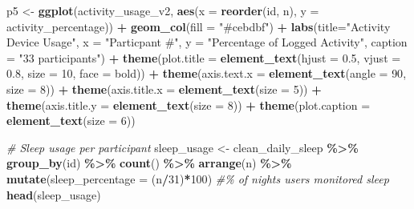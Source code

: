 \documentclass[
]{article}
\newenvironment{Shaded}{\begin{snugshade}}{\end{snugshade}}
\newcommand{\AttributeTok}[1]{\textcolor[rgb]{0.13,0.29,0.53}{#1}}
\newcommand{\CommentTok}[1]{\textcolor[rgb]{0.56,0.35,0.01}{\textit{#1}}}
\newcommand{\DecValTok}[1]{\textcolor[rgb]{0.00,0.00,0.81}{#1}}
\newcommand{\FloatTok}[1]{\textcolor[rgb]{0.00,0.00,0.81}{#1}}
\newcommand{\FunctionTok}[1]{\textcolor[rgb]{0.13,0.29,0.53}{\textbf{#1}}}
\newcommand{\NormalTok}[1]{#1}
\newcommand{\OtherTok}[1]{\textcolor[rgb]{0.56,0.35,0.01}{#1}}
\newcommand{\SpecialCharTok}[1]{\textcolor[rgb]{0.81,0.36,0.00}{\textbf{#1}}}
\newcommand{\StringTok}[1]{\textcolor[rgb]{0.31,0.60,0.02}{#1}}
\begin{document}
\begin{Shaded}
\begin{Highlighting}[]
\NormalTok{p5 }\OtherTok{\textless{}{-}} \FunctionTok{ggplot}\NormalTok{(activity\_usage\_v2, }\FunctionTok{aes}\NormalTok{(}\AttributeTok{x =} \FunctionTok{reorder}\NormalTok{(id, n), }\AttributeTok{y =}\NormalTok{ activity\_percentage)) }\SpecialCharTok{+}
  \FunctionTok{geom\_col}\NormalTok{(}\AttributeTok{fill =} \StringTok{"\#cebdbf"}\NormalTok{)  }\SpecialCharTok{+} 
  \FunctionTok{labs}\NormalTok{(}\AttributeTok{title=}\StringTok{"Activity Device Usage"}\NormalTok{, }\AttributeTok{x =} \StringTok{"Particpant \#"}\NormalTok{, }\AttributeTok{y =} \StringTok{"Percentage of Logged Activity"}\NormalTok{, }\AttributeTok{caption =} \StringTok{"33 participants"}\NormalTok{) }\SpecialCharTok{+}
  \FunctionTok{theme}\NormalTok{(}\AttributeTok{plot.title =} \FunctionTok{element\_text}\NormalTok{(}\AttributeTok{hjust =} \FloatTok{0.5}\NormalTok{, }\AttributeTok{vjust =} \FloatTok{0.8}\NormalTok{, }\AttributeTok{size =} \DecValTok{10}\NormalTok{, }\AttributeTok{face =} \StringTok{\textquotesingle{}bold\textquotesingle{}}\NormalTok{)) }\SpecialCharTok{+}
  \FunctionTok{theme}\NormalTok{(}\AttributeTok{axis.text.x =} \FunctionTok{element\_text}\NormalTok{(}\AttributeTok{angle =} \DecValTok{90}\NormalTok{, }\AttributeTok{size =} \DecValTok{8}\NormalTok{)) }\SpecialCharTok{+}
  \FunctionTok{theme}\NormalTok{(}\AttributeTok{axis.title.x =} \FunctionTok{element\_text}\NormalTok{(}\AttributeTok{size =} \DecValTok{5}\NormalTok{)) }\SpecialCharTok{+}
  \FunctionTok{theme}\NormalTok{(}\AttributeTok{axis.title.y =} \FunctionTok{element\_text}\NormalTok{(}\AttributeTok{size =} \DecValTok{8}\NormalTok{)) }\SpecialCharTok{+} 
  \FunctionTok{theme}\NormalTok{(}\AttributeTok{plot.caption =} \FunctionTok{element\_text}\NormalTok{(}\AttributeTok{size =} \DecValTok{6}\NormalTok{))}

\CommentTok{\# Sleep usage per participant}
\NormalTok{sleep\_usage }\OtherTok{\textless{}{-}}\NormalTok{ clean\_daily\_sleep }\SpecialCharTok{\%\textgreater{}\%} 
  \FunctionTok{group\_by}\NormalTok{(id) }\SpecialCharTok{\%\textgreater{}\%} 
  \FunctionTok{count}\NormalTok{() }\SpecialCharTok{\%\textgreater{}\%} 
  \FunctionTok{arrange}\NormalTok{(n) }\SpecialCharTok{\%\textgreater{}\%}
  \FunctionTok{mutate}\NormalTok{(}\AttributeTok{sleep\_percentage =}\NormalTok{ (n}\SpecialCharTok{/}\DecValTok{31}\NormalTok{)}\SpecialCharTok{*}\DecValTok{100}\NormalTok{) }\CommentTok{\#\% of nights users monitored sleep}
\FunctionTok{head}\NormalTok{(sleep\_usage)}
\end{Highlighting}
\end{Shaded}
\end{document}
